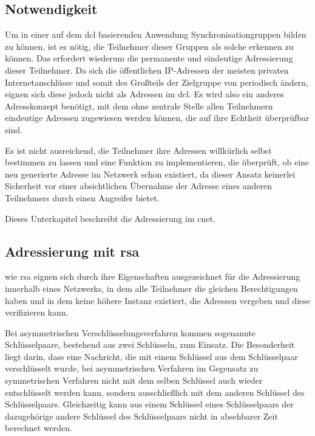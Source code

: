 
\subsection{Notwendigkeit}
Um in einer auf dem \gls{dcl} basierenden Anwendung Synchronisationgruppen bilden zu können, ist es
nötig, die Teilnehmer dieser Gruppen als solche erkennen zu können.
Das erfordert wiederum die permanente und eindeutige Adressierung dieser Teilnehmer.
Da sich die öffentlichen IP-Adressen der meisten privaten Internetanschlüsse und somit des Großteils der
Zielgruppe von \sblit periodisch ändern, eignen sich diese jedoch nicht als Adressen im \gls{dcl}. Es
wird also ein anderes Adresskonzept benötigt, mit dem ohne zentrale Stelle allen Teilnehmern eindeutige
Adressen zugewiesen werden können, die auf ihre Echtheit überprüfbar sind.

Es ist nicht ausreichend, die Teilnehmer ihre Adressen willkürlich selbst bestimmen zu lassen und eine
Funktion zu implementieren, die überprüft, ob eine neu generierte Adresse im Netzwerk schon existiert,
da dieser Ansatz keinerlei Sicherheit vor einer absichtlichen Übernahme der Adresse eines anderen
Teilnehmers durch einen Angreifer bietet.

Dieses Unterkapitel beschreibt die Adressierung im \gls{cnet}.


\subsection{Adressierung mit \gls*{rsa}}
 wie \gls{rsa} eignen sich durch ihre Eigenschaften
ausgezeichnet für die Adressierung innerhalb eines Netzwerks, in dem alle Teilnehmer die gleichen
Berechtigungen haben und in dem keine höhere Instanz existiert, die Adressen vergeben und diese
verifizieren kann.

Bei asymmetrischen Verschlüsselungsverfahren kommen sogenannte Schlüsselpaare, bestehend aus zwei
Schlüsseln, zum Einsatz. Die Besonderheit liegt darin, dass eine Nachricht, die mit einem Schlüssel
aus dem Schlüsselpaar verschlüsselt wurde, bei asymmetrischen Verfahren im Gegensatz zu symmetrischen
Verfahren nicht mit dem selben Schlüssel auch wieder entschlüsselt werden kann, sondern ausschließlich
mit dem anderen Schlüssel des Schlüsselpaars.
Gleichzeitig kann aus einem Schlüssel eines Schlüsselpaars der dazugehörige andere Schlüssel des
Schlüsselpaars nicht in absehbarer Zeit berechnet werden.

